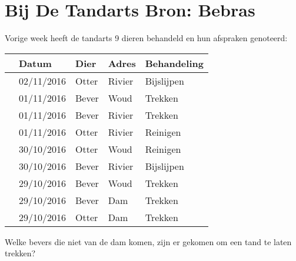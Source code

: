 \documentclass[12pt]{article}
\begin{document}
	\begin{minipage}{\textwidth}
		\section{Bij De Tandarts \hfill\small Bron: Bebras}
			Vorige week heeft de tandarts 9 dieren behandeld en hun afspraken genoteerd:
			
			\begin{table}[H]
				\centering
				\begin{tabular}{|l|l|l|l|l|}
					\hline
					\ding{51} & \textbf{Datum} & \textbf{Dier} & \textbf{Adres} & \textbf{Behandeling} \\ \hline\hline
					&02/11/2016 & Otter & Rivier & Bijslijpen \\
					&01/11/2016 & Bever & Woud & Trekken \\
					&01/11/2016 & Bever & Rivier & Trekken \\	
					&01/11/2016 & Otter & Rivier & Reinigen \\
					&30/10/2016 & Otter & Woud & Reinigen \\
					&30/10/2016 & Bever & Rivier & Bijslijpen \\
					&29/10/2016 & Bever & Woud & Trekken \\
					&29/10/2016 & Bever & Dam & Trekken \\
					&29/10/2016 & Otter & Dam & Trekken \\
					\hline 
				\end{tabular}
			\end{table}
			
			Welke bevers die niet van de dam komen, zijn er gekomen om een tand te laten trekken?

	\end{minipage} \\ \\ 
		
\end{document}
